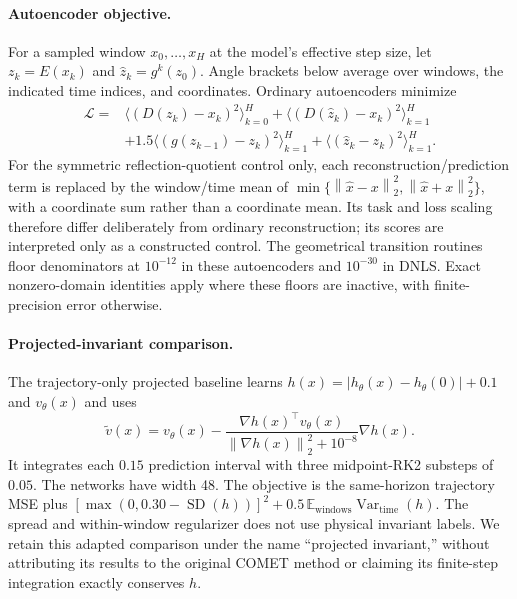 \documentclass[10pt]{article}
\theoremstyle{definition}
\theoremstyle{remark}
\newcommand{\norm}[1]{\left\lVert #1 \right\rVert}
\DeclareMathOperator{\Var}{Var}
\begin{document}
\paragraph{Autoencoder objective.}
For a sampled window $x_0,\ldots,x_H$ at the model's effective step size, let $z_k=E(x_k)$ and $\hat z_k=g^k(z_0)$. Angle brackets below average over windows, the indicated time indices, and coordinates. Ordinary autoencoders minimize
\begin{align}
 \mathcal L={}&\big\langle(D(z_k)-x_k)^2\big\rangle_{k=0}^H
 +\big\langle(D(\hat z_k)-x_k)^2\big\rangle_{k=1}^H\nonumber\\
 &+1.5\big\langle(g(z_{k-1})-z_k)^2\big\rangle_{k=1}^H
 +\big\langle(\hat z_k-z_k)^2\big\rangle_{k=1}^H.
 \label{eq:training_loss}
\end{align}
For the symmetric reflection-quotient control only, each reconstruction/prediction term is replaced by the window/time mean of $\min\{\norm{\hat x-x}_2^2,\norm{\hat x+x}_2^2\}$, with a coordinate sum rather than a coordinate mean. Its task and loss scaling therefore differ deliberately from ordinary reconstruction; its scores are interpreted only as a constructed control. The geometrical transition routines floor denominators at $10^{-12}$ in these autoencoders and $10^{-30}$ in DNLS. Exact nonzero-domain identities apply where these floors are inactive, with finite-precision error otherwise.

\paragraph{Projected-invariant comparison.}
The trajectory-only projected baseline learns $h(x)=|h_\theta(x)-h_\theta(0)|+0.1$ and $v_\theta(x)$ and uses
\begin{equation}
 \tilde v(x)=v_\theta(x)-\frac{\nabla h(x)^\top v_\theta(x)}{\norm{\nabla h(x)}_2^2+10^{-8}}\nabla h(x).
\end{equation}
It integrates each $0.15$ prediction interval with three midpoint-RK2 substeps of $0.05$. The networks have width 48. The objective is the same-horizon trajectory MSE plus $[\max(0,0.30-\operatorname{SD}(h))]^2+0.5\,\mathbb E_{\mathrm{windows}}\Var_{\mathrm{time}}(h)$. The spread and within-window regularizer does not use physical invariant labels. We retain this adapted comparison under the name ``projected invariant,'' without attributing its results to the original COMET method or claiming its finite-step integration exactly conserves $h$.
\end{document}
